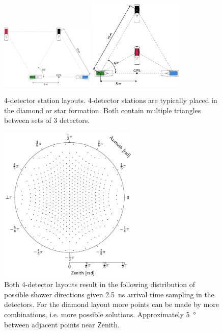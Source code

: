 \begin{figure}
    \centering
    \includegraphics[width=0.4\textwidth]
                    {plots/experiment/4_detector_diamond}
    \includegraphics[width=0.4\textwidth]
                    {plots/experiment/4_detector_star}
    \caption{4-detector station layouts. 4-detector stations are typically placed in the diamond or star formation. Both contain multiple triangles between sets of 3 detectors.}
    \label{fig:4_detector_star}
\end{figure}


\begin{figure}
    \centering
    \includegraphics[width=0.6\textwidth]
                    {plots/experiment/discrete_directions}
    \caption{Both 4-detector layouts result in the following distribution of possible shower directions given \SI{2.5}{\ns} arrival time sampling in the detectors. For the diamond layout more points can be made by more combinations, i.e. more possible solutions. Approximately \SI{5}{\degree} between adjacent points near Zenith.}
    \label{fig:discrete_directions}
\end{figure}


